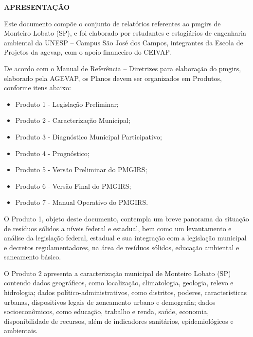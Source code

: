 \thispagestyle{headfootimage}

\begin{center}
    {\bfseries\Large\MakeUppercase{Apresentação}}
    \vspace{1.5em}
\end{center}
Este documento compõe o conjunto de relatórios referentes ao \gls{pmgirs} de Monteiro Lobato (SP), e foi elaborado por estudantes e estagiários de engenharia ambiental da UNESP – Campus São José dos Campos, integrantes da Escola de Projetos da \gls{agevap}, com o apoio financeiro do CEIVAP.\vspace{1.5em}

De acordo com o Manual de Referência – Diretrizes para elaboração do \gls{pmgirs}, elaborado pela AGEVAP, os Planos devem ser organizados em Produtos, conforme itens abaixo:

\begin{itemize}
    \item {Produto 1 - Legislação Preliminar;}
    \item {Produto 2 - Caracterização Municipal;}
    \item {Produto 3 - Diagnóstico Municipal Participativo;}
    \item Produto 4 - Prognóstico;
    \item Produto 5 - Versão Preliminar do PMGIRS;
    \item Produto 6 - Versão Final do PMGIRS;
    \item Produto 7 - Manual Operativo do PMGIRS.
\end{itemize}



O Produto 1, objeto deste documento, contempla um breve panorama da situação de resíduos sólidos a níveis federal e estadual, bem como um levantamento e análise da legislação federal, estadual e sua integração com a legislação municipal e decretos regulamentadores, na área de resíduos sólidos, educação ambiental e saneamento básico.\vspace{1.5em}

O Produto 2 apresenta a caracterização municipal de Monteiro Lobato (SP) contendo dados geográficos, como localização, climatologia, geologia, relevo e hidrologia; dados político-administrativos, como distritos, poderes, características urbanas, dispositivos legais de zoneamento urbano e demografia; dados socioeconômicos, como educação, trabalho e renda, saúde, economia, disponibilidade de recursos, além de indicadores sanitários, epidemiológicos e ambientais.\vspace{1.5em}

